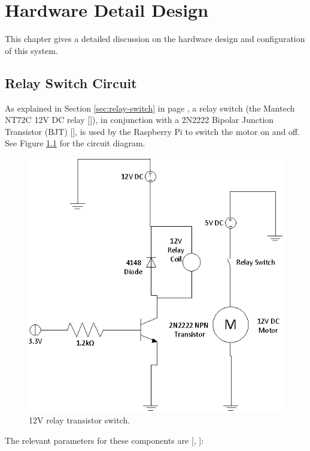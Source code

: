 \chapter{Hardware Detail Design}
\label{chap:5}

This chapter gives a detailed discussion on the hardware design and
configuration of this system. 

\section{Relay Switch Circuit}
\label{sec:detail-switch}

As explained in Section \ref{sec:relay-switch} in page \pageref{sec:relay-switch}, a relay
switch (the Mantech NT72C 12V DC relay [\cite{manual:relay-specs}]), in conjunction with a 2N2222
Bipolar Junction Transistor (BJT) [\cite{maunual:transistor-datasheet}], is used
by the Raspberry Pi to switch the motor on and off. See Figure
\ref{fig:relay-switch} for the circuit diagram.

\begin{figure}
\centering
\includegraphics[scale=0.7]{relay_switch.eps}
\caption{12V relay transistor switch. }
\label{fig:relay-switch}
\end{figure}

The relevant  parameters for these components are [\cite{manual:relay-specs},
\cite{maunual:transistor-datasheet}]:

